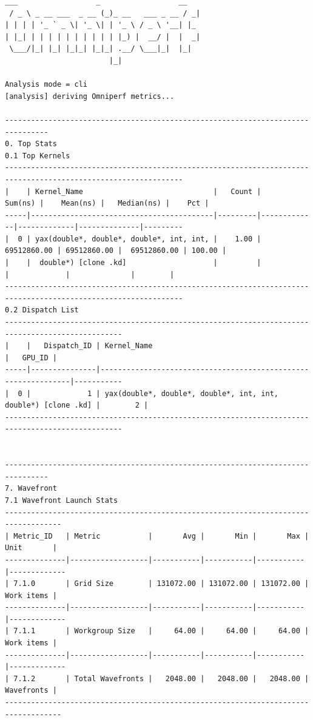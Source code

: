\documentclass[
]{article}
\begin{document}
\begin{Verbatim}[fontsize=\footnotesize] 
  ___                  _                  __
 / _ \ _ __ ___  _ __ (_)_ __   ___ _ __ / _|
| | | | '_ ` _ \| '_ \| | '_ \ / _ \ '__| |_
| |_| | | | | | | | | | | |_) |  __/ |  |  _|
 \___/|_| |_| |_|_| |_|_| .__/ \___|_|  |_|
                        |_|

Analysis mode = cli
[analysis] deriving Omniperf metrics...
                                                                                                                                                                                                                --------------------------------------------------------------------------------
0. Top Stats
0.1 Top Kernels
---------------------------------------------------------------------------------------------------------------
|    | Kernel_Name                              |   Count |     Sum(ns) |    Mean(ns) |   Median(ns) |    Pct |
-----|------------------------------------------|---------|-------------|-------------|--------------|---------
|  0 | yax(double*, double*, double*, int, int, |    1.00 | 69512860.00 | 69512860.00 |  69512860.00 | 100.00 |
|    |  double*) [clone .kd]                    |         |             |             |              |        |
---------------------------------------------------------------------------------------------------------------                                                                                                 0.2 Dispatch List
-------------------------------------------------------------------------------------------------
|    |   Dispatch_ID | Kernel_Name                                                   |   GPU_ID |
-----|---------------|---------------------------------------------------------------|-----------
|  0 |             1 | yax(double*, double*, double*, int, int, double*) [clone .kd] |        2 |
-------------------------------------------------------------------------------------------------

                                                                                                                                                                                                                --------------------------------------------------------------------------------
7. Wavefront
7.1 Wavefront Launch Stats
-----------------------------------------------------------------------------------
| Metric_ID   | Metric           |       Avg |       Min |       Max | Unit       |
--------------|------------------|-----------|-----------|-----------|-------------
| 7.1.0       | Grid Size        | 131072.00 | 131072.00 | 131072.00 | Work items |
--------------|------------------|-----------|-----------|-----------|-------------
| 7.1.1       | Workgroup Size   |     64.00 |     64.00 |     64.00 | Work items |
--------------|------------------|-----------|-----------|-----------|-------------
| 7.1.2       | Total Wavefronts |   2048.00 |   2048.00 |   2048.00 | Wavefronts |
-----------------------------------------------------------------------------------
\end{Verbatim}
\end{document}
